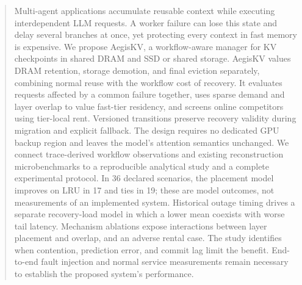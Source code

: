 \begin{abstract}
Multi-agent applications accumulate reusable context while executing
interdependent LLM requests. A worker failure can lose this state and delay
several branches at once, yet protecting every context in fast memory is
expensive. We propose AegisKV, a workflow-aware manager for KV checkpoints
in shared DRAM and SSD or shared storage. AegisKV values DRAM retention,
storage demotion, and final eviction separately, combining normal reuse
with the workflow cost of recovery. It evaluates requests affected by a
common failure together, uses sparse demand and layer overlap to value
fast-tier residency, and screens online competitors using tier-local rent.
Versioned transitions preserve recovery validity during migration and
explicit fallback. The design requires no dedicated GPU backup region and leaves
the model's attention semantics unchanged. We connect trace-derived
workflow observations and existing reconstruction microbenchmarks to a
reproducible analytical study and a complete experimental protocol.
In 36 declared scenarios, the placement model improves on LRU in 17 and
ties in 19; these are model outcomes, not measurements of an implemented
system. Historical outage timing drives a separate recovery-load model in which
a lower mean coexists with worse tail latency. Mechanism ablations expose
interactions between layer placement and overlap, and an adverse rental
case. The study identifies when contention, prediction error, and commit
lag limit the benefit. End-to-end fault injection and normal
service measurements remain necessary to establish the proposed system's
performance.
\end{abstract}
